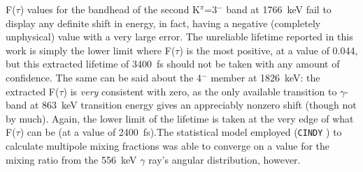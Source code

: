 F($\tau$) values for the bandhead of the second K$^\pi$=3$^-$ band at 1766~keV fail to display any definite shift in energy, in fact, having a negative (completely unphysical) value with a very large error. The unreliable lifetime reported in this work is simply the lower limit where F($\tau$) is the most positive, at a value of 0.044, but this extracted lifetime of 3400~fs should not be taken with any amount of confidence. The same can be said about the 4$^-$ member at 1826~keV: the extracted F($\tau$) is \textit{very} consistent with zero, as the only available transition to $\gamma$-band at 863~keV transition energy gives an appreciably nonzero shift (though not by much). Again, the lower limit of the lifetime is taken at the very edge of what F($\tau$) can be (at a value of 2400~fs).The statistical model employed ({\tt CINDY} \cite{SHELDON197399}) to calculate multipole mixing fractions was able to converge on a value for the mixing ratio from the 556~keV $\gamma$ ray's angular distribution, however.

